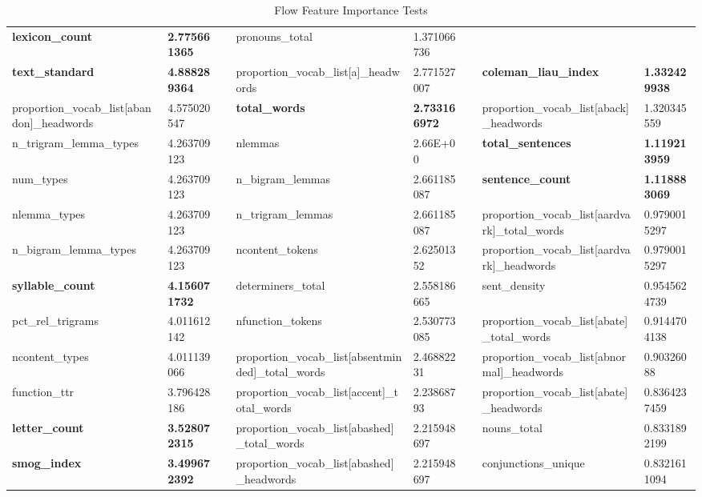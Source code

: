 \begin{table}[h]
{\begin{tabular}{@{}llllllll@{}}
  \cellcolor[HTML]{EFEFEF}\textbf{lexicon\_count} &
  \cellcolor[HTML]{EFEFEF}\textbf{2.775661365} &
  &
  pronouns\_total &
  1.371066736 \\
\cellcolor[HTML]{EFEFEF}\textbf{text\_standard} &
  \cellcolor[HTML]{EFEFEF}\textbf{4.888289364} &
  &
  proportion\_vocab\_list{[}a{]}\_headwords &
  2.771527007 &
  &
  \cellcolor[HTML]{EFEFEF}\textbf{coleman\_liau\_index} &
  \cellcolor[HTML]{EFEFEF}\textbf{1.332429938} \\
proportion\_vocab\_list{[}abandon{]}\_headwords &
  4.575020547 &
  &
  \cellcolor[HTML]{EFEFEF}\textbf{total\_words} &
  \cellcolor[HTML]{EFEFEF}\textbf{2.733166972} &
  &
  proportion\_vocab\_list{[}aback{]}\_headwords &
  1.320345559 \\
n\_trigram\_lemma\_types &
  4.263709123 &
  &
  nlemmas &
  2.66E+00 &
  &
  \cellcolor[HTML]{EFEFEF}\textbf{total\_sentences} &
  \cellcolor[HTML]{EFEFEF}\textbf{1.119213959} \\
num\_types &
  4.263709123 &
  &
  n\_bigram\_lemmas &
  2.661185087 &
  &
  \cellcolor[HTML]{EFEFEF}\textbf{sentence\_count} &
  \cellcolor[HTML]{EFEFEF}\textbf{1.118883069} \\
nlemma\_types &
  4.263709123 &
  &
  n\_trigram\_lemmas &
  2.661185087 &
  &
  proportion\_vocab\_list{[}aardvark{]}\_total\_words &
  0.9790015297 \\
n\_bigram\_lemma\_types &
  4.263709123 &
  &
  ncontent\_tokens &
  2.62501352 &
  &
  proportion\_vocab\_list{[}aardvark{]}\_headwords &
  0.9790015297 \\
\cellcolor[HTML]{EFEFEF}\textbf{syllable\_count} &
  \cellcolor[HTML]{EFEFEF}\textbf{4.156071732} &
  &
  determiners\_total &
  2.558186665 &
  &
  sent\_density &
  0.9545624739 \\
pct\_rel\_trigrams &
  4.011612142 &
  &
  nfunction\_tokens &
  2.530773085 &
  &
  proportion\_vocab\_list{[}abate{]}\_total\_words &
  0.9144704138 \\
ncontent\_types &
  4.011139066 &
  &
  proportion\_vocab\_list{[}absentminded{]}\_total\_words &
  2.46882231 &
  &
  proportion\_vocab\_list{[}abnormal{]}\_headwords &
  0.90326088 \\
function\_ttr &
  3.796428186 &
  &
  proportion\_vocab\_list{[}accent{]}\_total\_words &
  2.23868793 &
  &
  proportion\_vocab\_list{[}abate{]}\_headwords &
  0.8364237459 \\
\cellcolor[HTML]{EFEFEF}\textbf{letter\_count} &
  \cellcolor[HTML]{EFEFEF}\textbf{3.528072315} &
  &
  proportion\_vocab\_list{[}abashed{]}\_total\_words &
  2.215948697 &
  &
  nouns\_total &
  0.8331892199 \\
\cellcolor[HTML]{EFEFEF}\textbf{smog\_index} &
  \cellcolor[HTML]{EFEFEF}\textbf{3.499672392} &
  &
  proportion\_vocab\_list{[}abashed{]}\_headwords &
  2.215948697 &
  &
  conjunctions\_unique &
  0.8321611094 \\ \bottomrule
\end{tabular}%
}
\caption{Flow Feature Importance Tests}
\end{table}

